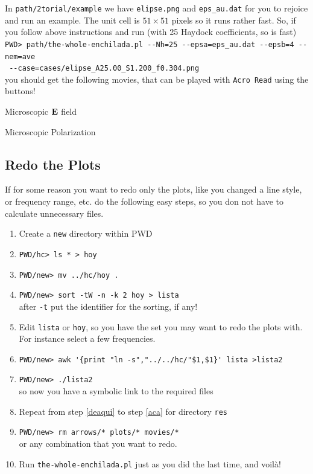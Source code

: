 \documentclass[preprint,12pt]{revtex4}
\begin{document}
In \verb=path/2torial/example= we have \verb=elipse.png= and
\verb=eps_au.dat= for you to rejoice and run an example. The unit cell
is $51\times 51$ pixels so it runs rather fast. So, if you follow
above instructions and run (with 25 Haydock coefficients, so is fast)\\
\Verb+PWD> path/the-whole-enchilada.pl --Nh=25 --epsa=eps_au.dat --epsb=4 --nem=ave+
\\\Verb+ --case=cases/elipse_A25.00_S1.200_f0.304.png+\\
you should get the following movies, that can be played with
\verb=Acro Read= using the buttons!
\begin{center}
\newpage
Microscopic $\mathbf{E}$ field\\
\vfill
 
Microscopic Polarization\\

\vspace{2cm}

\end{center}

\subsection{Redo the Plots}

If for some reason you want to redo only the plots, like you changed a
line style, or frequency range, etc. do the following easy steps, so
you don not have to calculate unnecessary files.
\begin{enumerate}
\item Create a \verb=new= directory within PWD
\item \verb=PWD/hc> ls * > hoy=\label{deaqui}
\item \verb=PWD/new> mv ../hc/hoy .=
\item \verb=PWD/new> sort -tW -n -k 2 hoy > lista=\\after \verb=-t=
  put the identifier for the sorting, if any!
\item Edit \verb=lista= or \verb=hoy=, so you have the set you may want to redo the
  plots with. For instance select a few frequencies.
\item \verb=PWD/new> awk '{print "ln -s","../../hc/"$1,$1}' lista >lista2=
\item \verb=PWD/new> ./lista2=\\so now you have a symbolic link to the
  required files\label{aca}
\item Repeat from step \ref{deaqui} to  step \ref{aca} for directory \verb=res=
\item \verb=PWD/new> rm arrows/* plots/* movies/*=\\or any combination
  that you want to redo.
\item Run \verb=the-whole-enchilada.pl= just as you did the last time,
  and voil\`a!
\end{enumerate} 
\end{document}
